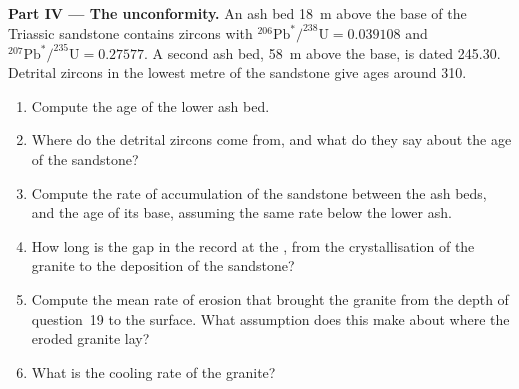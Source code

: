 \begin{problem}
\noindent\textbf{Part IV --- The unconformity.} An ash bed \qty{18}{m} above the
base of the Triassic sandstone contains zircons with
$^{206}\mathrm{Pb}^*/^{238}\mathrm{U} = 0.039108$ and
$^{207}\mathrm{Pb}^*/^{235}\mathrm{U} = 0.27577$. A second ash bed, \qty{58}{m}
above the base, is dated \qty{245.30}{\Ma}. Detrital zircons in the lowest metre
of the sandstone give ages around \qty{310}{\Ma}.
\begin{enumerate}[resume]
  \item Compute the age of the lower ash bed.
  \item Where do the detrital zircons come from, and what do they say about the
        age of the sandstone?
  \item Compute the rate of accumulation of the sandstone between the ash beds,
        and the age of its base, assuming the same rate below the lower ash.
  \item How long is the gap in the record at the , from the
        crystallisation of the granite to the deposition of the sandstone?
  \item Compute the mean rate of erosion that brought the granite from the depth
        of question~19 to the surface. What assumption does this make about where
        the eroded granite lay?
  \item What is the cooling rate of the granite?
\end{enumerate}
\end{problem}
